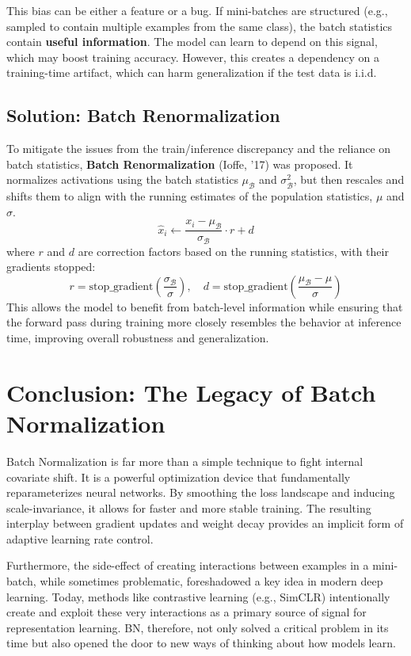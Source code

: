 \documentclass{article}
\begin{document}
This bias can be either a feature or a bug. If mini-batches are structured (e.g., sampled to contain multiple examples from the same class), the batch statistics contain \textbf{useful information}. The model can learn to depend on this signal, which may boost training accuracy. However, this creates a dependency on a training-time artifact, which can harm generalization if the test data is i.i.d.

\subsection{Solution: Batch Renormalization}
To mitigate the issues from the train/inference discrepancy and the reliance on batch statistics, \textbf{Batch Renormalization} (Ioffe, '17) was proposed. It normalizes activations using the batch statistics $\mu_\mathcal{B}$ and $\sigma_\mathcal{B}^2$, but then rescales and shifts them to align with the running estimates of the population statistics, $\mu$ and $\sigma$.
$$ \hat{x}_i \leftarrow \frac{x_i - \mu_{\mathcal{B}}}{\sigma_{\mathcal{B}}} \cdot r + d $$
where $r$ and $d$ are correction factors based on the running statistics, with their gradients stopped:
$$ r = \text{stop\_gradient}\left(\frac{\sigma_{\mathcal{B}}}{\sigma}\right), \quad d = \text{stop\_gradient}\left(\frac{\mu_{\mathcal{B}} - \mu}{\sigma}\right) $$
This allows the model to benefit from batch-level information while ensuring that the forward pass during training more closely resembles the behavior at inference time, improving overall robustness and generalization.

\section{Conclusion: The Legacy of Batch Normalization}
Batch Normalization is far more than a simple technique to fight internal covariate shift. It is a powerful optimization device that fundamentally reparameterizes neural networks. By smoothing the loss landscape and inducing scale-invariance, it allows for faster and more stable training. The resulting interplay between gradient updates and weight decay provides an implicit form of adaptive learning rate control.

Furthermore, the side-effect of creating interactions between examples in a mini-batch, while sometimes problematic, foreshadowed a key idea in modern deep learning. Today, methods like contrastive learning (e.g., SimCLR) intentionally create and exploit these very interactions as a primary source of signal for representation learning. BN, therefore, not only solved a critical problem in its time but also opened the door to new ways of thinking about how models learn.
\end{document}
